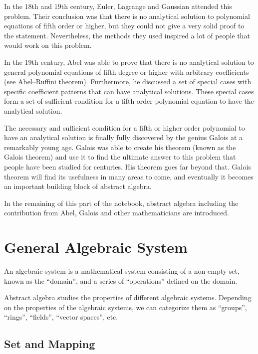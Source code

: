 In the $18$th and $19$th century, Euler, Lagrange and Gaussian attended this problem. Their conclusion was that there is no analytical solution to polynomial equations of fifth order or higher, but they could not give a very solid proof to the statement. Nevertheless, the methods they used inspired a lot of people that would work on this problem.

In the $19$th century, Abel was able to prove that there is no analytical solution to general polynomial equations of fifth degree or higher with arbitrary coefficients (see Abel–Ruffini theorem). Furthermore, he discussed a set of special cases with specific coefficient patterns that can have analytical solutions. These special cases form a set of sufficient condition for a fifth order polynomial equation to have the analytical solution. 

The necessary and sufficient condition for a fifth or higher order polynomial to have an analytical solution is finally fully discovered by the genius Galois at a remarkably young age. Galois was able to create his theorem (known as the Galois theorem) and use it to find the ultimate answer to this problem that people have been studied for centuries. His theorem goes far beyond that. Galois theorem will find its usefulness in many areas to come, and eventually it becomes an important building block of abstract algebra. 

In the remaining of this part of the notebook, abstract algebra including the contribution from Abel, Galois and other mathematicians are introduced.

\section{General Algebraic System}

An algebraic system is a mathematical system consisting of a non-empty set, known as the ``domain'', and a series of ``operations'' defined on the domain. 

Abstract algebra studies the properties of different algebraic systems. Depending on the properties of the algebraic systems, we can categorize them as ``groups'', ``rings'', ``fields'', ``vector spaces'', etc.

\subsection{Set and Mapping}

